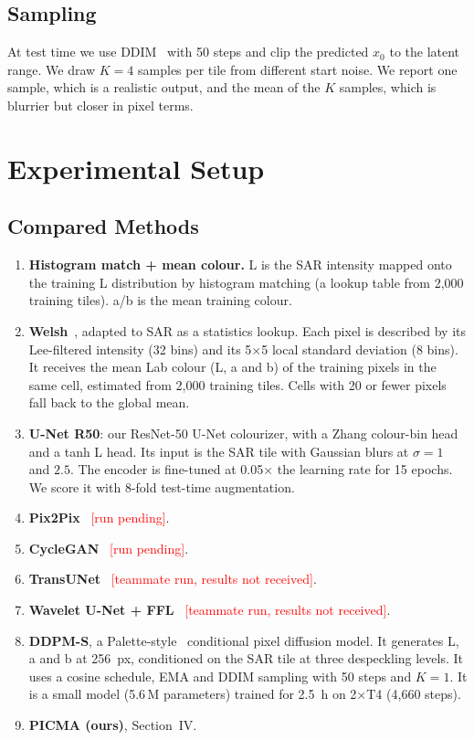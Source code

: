 \documentclass[conference]{IEEEtran}
\newcommand{\pend}[1]{\textcolor{red}{[#1]}}
\begin{document}
\subsection{Sampling}
At test time we use DDIM~\cite{song2021ddim} with 50 steps and clip the predicted $x_0$ to
the latent range. We draw $K=4$ samples per tile from different start noise. We report one
sample, which is a realistic output, and the mean of the $K$ samples, which is blurrier but
closer in pixel terms.

\section{Experimental Setup}

\subsection{Compared Methods}
\begin{enumerate}
\item \textbf{Histogram match + mean colour.} L is the SAR intensity mapped onto the
  training L distribution by histogram matching (a lookup table from 2{,}000 training
  tiles). a/b is the mean training colour.
\item \textbf{Welsh}~\cite{welsh2002transferring}, adapted to SAR as a statistics lookup.
  Each pixel is described by its Lee-filtered intensity (32 bins) and its 5$\times$5 local
  standard deviation (8 bins). It receives the mean Lab colour (L, a and b) of the training
  pixels in the same cell, estimated from 2{,}000 training tiles. Cells with 20 or fewer
  pixels fall back to the global mean.
\item \textbf{U-Net R50}: our ResNet-50 U-Net colourizer, with a Zhang colour-bin
  head~\cite{zhang2016colorful} and a tanh L head. Its input is the SAR tile with Gaussian blurs at
  $\sigma=1$ and $2.5$. The encoder is fine-tuned at 0.05$\times$ the learning rate for 15
  epochs. We score it with 8-fold test-time augmentation.
\item \textbf{Pix2Pix}~\cite{isola2017pix2pix} \pend{run pending}.
\item \textbf{CycleGAN}~\cite{zhu2017cyclegan} \pend{run pending}.
\item \textbf{TransUNet}~\cite{chen2021transunet} \pend{teammate run, results not received}.
\item \textbf{Wavelet U-Net + FFL}~\cite{liu2018mwcnn,jiang2021ffl}
  \pend{teammate run, results not received}.
\item \textbf{DDPM-S}, a Palette-style~\cite{saharia2022palette} conditional pixel diffusion
  model. It generates L, a and b at 256~px, conditioned on the SAR tile at three
  despeckling levels. It uses a cosine schedule, EMA and DDIM sampling with 50 steps and
  $K=1$. It is a small model (5.6\,M parameters) trained for 2.5~h on 2$\times$T4
  (4{,}660 steps).
\item \textbf{PICMA (ours)}, Section~IV.
\end{enumerate}
\end{document}
